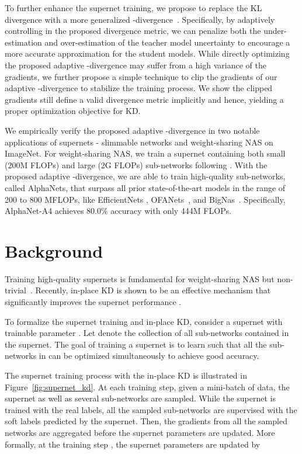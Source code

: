 \documentclass{article}
\begin{document}
To further enhance the supernet training, we propose to replace the KL divergence with a more generalized -divergence~\citep{amari1985differential, minka2005divergence}. 
Specifically, by adaptively controlling  in the proposed divergence metric, we can penalize both the under-estimation and over-estimation of the teacher model uncertainty to encourage a more accurate approximation for the student models. 
While directly optimizing the proposed adaptive -divergence may suffer from a high variance of the gradients, we further propose a simple technique to clip the gradients of our adaptive -divergence to stabilize the training process.
We show the clipped gradients still define a valid divergence metric implicitly and hence, yielding a proper optimization objective for KD.

We empirically verify the proposed adaptive -divergence in two notable applications of supernets - slimmable networks \citep{yu2019universally} and weight-sharing NAS \citep{yu2020bignas, wang2020attentivenas} on ImageNet. For weight-sharing NAS, we train a supernet containing both small (200M FLOPs) and large (2G FLOPs) sub-networks following \citet{wang2020attentivenas}. With the proposed adaptive -divergence, we are able to train high-quality sub-networks, called AlphaNets, that surpass all prior state-of-the-art models in the range of 200 to 800 MFLOPs, like EfficientNets \citep{tan2019efficientnet}, OFANets~\citep{cai2019once}, and BigNas~\citep{yu2020bignas}. 
Specifically, AlphaNet-A4 achieves 80.0\% accuracy with only 444M FLOPs.



 
\section{Background}


Training high-quality supernets is fundamental for weight-sharing NAS but non-trivial~\citep{benyahia2019overcoming}. 
Recently, in-place KD is shown to be an effective mechanism that significantly improves the supernet performance \citep{yu2019universally, yu2020bignas}. 

To formalize the supernet training and in-place KD, consider a supernet with trainable parameter .
Let  denote the collection of all sub-networks contained in the supernet. 
The goal of training a supernet is to learn  such that all the sub-networks in  can be optimized simultaneously to achieve good accuracy.

The supernet training process with the in-place KD is illustrated in Figure~\ref{fig:supernet_kd}. At each training step, given a mini-batch of data, the supernet as well as several sub-networks are sampled. While the supernet is trained with the real labels, all the sampled sub-networks are supervised with the soft labels predicted by the supernet. Then, the gradients from all the sampled networks are aggregated before the supernet parameters are updated. More formally, at the training step , the supernet parameters  are updated by
\end{document}
